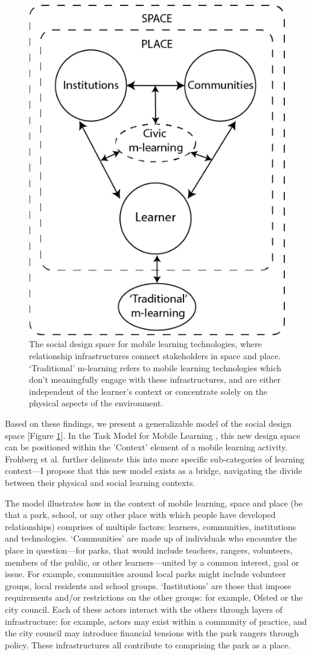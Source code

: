 \begin{figure}
  \centering
  \includegraphics[width=0.45\columnwidth]{images/chapter04/designSpace.png}
  \caption[The social design space for mobile learning technologies]{The social design space for mobile learning technologies, where relationship infrastructures connect stakeholders in space and place. `Traditional' m-learning refers to mobile learning technologies which don’t meaningfully engage with these infrastructures, and are either independent of the learner’s context or concentrate solely on the physical aspects of the environment.}
  \label{fig:designSpace}
\end{figure}

Based on these findings, we present a generalizable model of the social design space [Figure \ref{fig:designSpace}]. In the Task Model for Mobile Learning \citep{Taylor2006}, this new design space can be positioned within the 'Context' element of a mobile learning activity. Frohberg et al. further delineate this into more specific sub-categories of learning context---I propose that this new model exists as a bridge, navigating the divide between their physical and social learning contexts.

The model illustrates how in the context of mobile learning, space and place (be that a park, school, or any other place with which people have developed relationships) comprises of multiple factors: learners, communities, institutions and technologies. `Communities' are made up of individuals who encounter the place in question---for parks, that would include teachers, rangers, volunteers, members of the public, or other learners---united by a common interest, goal or issue. For example, communities around local parks might include volunteer groups, local residents and school groups. `Institutions' are those that impose requirements and/or restrictions on the other groups: for example, Ofsted or the city council. Each of these actors interact with the others through layers of infrastructure: for example, actors may exist within a community of practice, and the city council may introduce financial tensions with the park rangers through policy. These infrastructures all contribute to comprising the park as a place.

